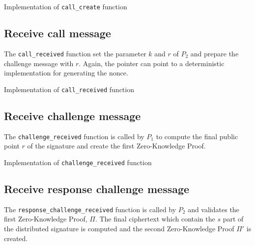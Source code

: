 \begin{listing}
	\caption{Implementation of \texttt{call\_create} function}
	\label{lst:implCallCreateFunc}
\end{listing}

\subsection{Receive call message}

The \texttt{call\_received} function set the parameter $k$ and $r$ of $P_2$ and
prepare the challenge message with $r$. Again, the pointer can point to a deterministic
implementation for generating the nonce.

\begin{listing}
	\caption{Implementation of \texttt{call\_received} function}
	\label{lst:implCallReceivedFunc}
\end{listing}

\newpage

\subsection{Receive challenge message}

The \texttt{challenge\_received} function is called by $P_1$ to compute the final
public point $r$ of the signature and create the first Zero-Knowledge Proof.

\begin{listing}
	\caption{Implementation of \texttt{challenge\_received} function}
	\label{lst:implChallengeReceivedFunc}
\end{listing}

\newpage

\subsection{Receive response challenge message}

The \texttt{response\_challenge\_received} function is called by $P_2$ and
validates the first Zero-Knowledge Proof, $\Pi$. The final ciphertext
which contain the $s$ part of the distributed signature is computed and the
second Zero-Knowledge Proof $\Pi'$ is created.

